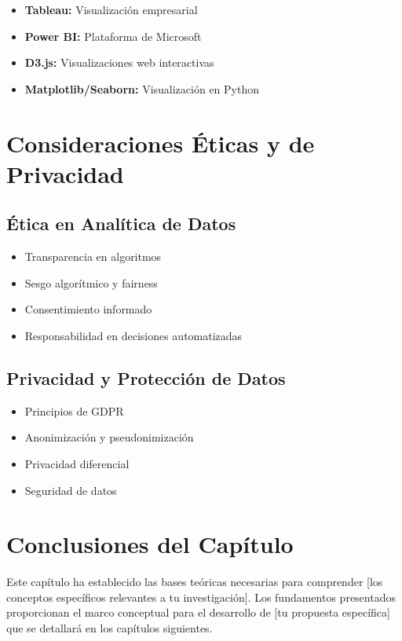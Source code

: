 \begin{itemize}
    \item \textbf{Tableau:} Visualización empresarial
    \item \textbf{Power BI:} Plataforma de Microsoft
    \item \textbf{D3.js:} Visualizaciones web interactivas
    \item \textbf{Matplotlib/Seaborn:} Visualización en Python
\end{itemize}

\section{Consideraciones Éticas y de Privacidad}

\subsection{Ética en Analítica de Datos}

\begin{itemize}
    \item Transparencia en algoritmos
    \item Sesgo algorítmico y fairness
    \item Consentimiento informado
    \item Responsabilidad en decisiones automatizadas
\end{itemize}

\subsection{Privacidad y Protección de Datos}

\begin{itemize}
    \item Principios de GDPR
    \item Anonimización y pseudonimización
    \item Privacidad diferencial
    \item Seguridad de datos
\end{itemize}

\section{Conclusiones del Capítulo}

Este capítulo ha establecido las bases teóricas necesarias para comprender [los conceptos específicos relevantes a tu investigación]. Los fundamentos presentados proporcionan el marco conceptual para el desarrollo de [tu propuesta específica] que se detallará en los capítulos siguientes.
